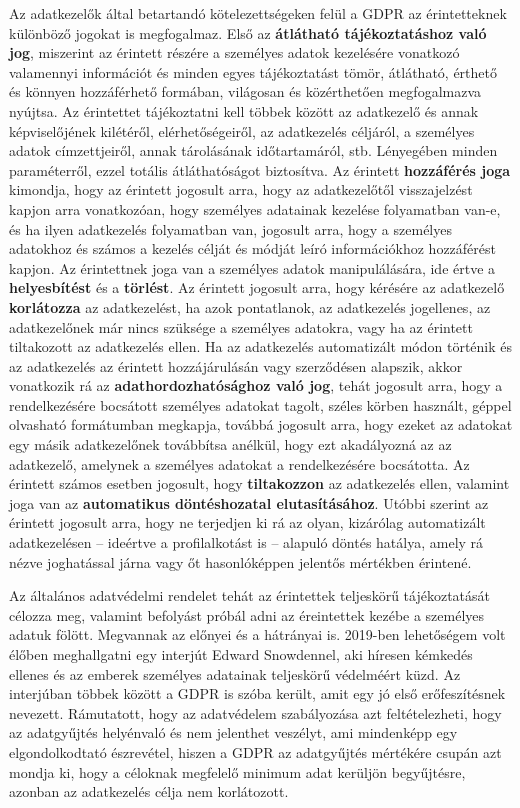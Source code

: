 Az adatkezelők által betartandó kötelezettségeken felül a GDPR az érintetteknek különböző jogokat is megfogalmaz. Első az \textbf{átlátható tájékoztatáshoz való jog}, miszerint az érintett részére a személyes adatok kezelésére vonatkozó valamennyi információt és minden egyes tájékoztatást tömör, átlátható, érthető és könnyen hozzáférhető formában, világosan és közérthetően megfogalmazva nyújtsa. Az érintettet tájékoztatni kell többek között az adatkezelő és annak képviselőjének kilétéről, elérhetőségeiről, az adatkezelés céljáról, a személyes adatok címzettjeiről, annak tárolásának időtartamáról, stb. Lényegében minden paraméterről, ezzel totális átláthatóságot biztosítva. Az érintett \textbf{hozzáférés joga} kimondja, hogy az érintett jogosult arra, hogy az adatkezelőtől visszajelzést kapjon arra vonatkozóan, hogy személyes adatainak kezelése folyamatban van-e, és ha ilyen adatkezelés folyamatban van, jogosult arra, hogy a személyes adatokhoz és számos a kezelés célját és módját leíró információkhoz hozzáférést kapjon. Az érintettnek joga van a személyes adatok manipulálására, ide értve a \textbf{helyesbítést} és a \textbf{törlést}. Az érintett jogosult arra, hogy kérésére az adatkezelő \textbf{korlátozza} az adatkezelést, ha azok pontatlanok, az adatkezelés jogellenes, az adatkezelőnek már nincs szüksége a személyes adatokra, vagy ha az érintett tiltakozott az adatkezelés ellen. Ha az adatkezelés automatizált módon történik és az adatkezelés az érintett hozzájárulásán vagy szerződésen alapszik, akkor vonatkozik rá az \textbf{adathordozhatósághoz való jog}, tehát jogosult arra, hogy a rendelkezésére bocsátott személyes adatokat tagolt, széles körben használt, géppel olvasható formátumban megkapja, továbbá jogosult arra, hogy ezeket az adatokat egy másik adatkezelőnek továbbítsa anélkül, hogy ezt akadályozná az az adatkezelő, amelynek a személyes adatokat a rendelkezésére bocsátotta. Az érintett számos esetben jogosult, hogy \textbf{tiltakozzon} az adatkezelés ellen, valamint joga van az \textbf{automatikus döntéshozatal elutasításához}. Utóbbi szerint az érintett jogosult arra, hogy ne terjedjen ki rá az olyan, kizárólag automatizált adatkezelésen – ideértve a profilalkotást is – alapuló döntés hatálya, amely rá nézve joghatással járna vagy őt hasonlóképpen jelentős mértékben érintené. \cite{GDPR}

Az általános adatvédelmi rendelet tehát az érintettek teljeskörű tájékoztatását célozza meg, valamint befolyást próbál adni az éreintettek kezébe a személyes adatuk fölött. Megvannak az előnyei és a hátrányai is. 2019-ben lehetőségem volt élőben meghallgatni egy interjút \cite{Snowden} Edward Snowdennel, aki híresen kémkedés ellenes és az emberek személyes adatainak teljeskörű védelméért küzd. Az interjúban többek között a GDPR is szóba került, amit egy jó első erőfeszítésnek nevezett. Rámutatott, hogy az adatvédelem szabályozása azt feltételezheti, hogy az adatgyűjtés helyénvaló és nem jelenthet veszélyt, ami mindenképp egy elgondolkodtató észrevétel, hiszen a GDPR az adatgyűjtés mértékére csupán azt mondja ki, hogy a céloknak megfelelő minimum adat kerüljön begyűjtésre, azonban az adatkezelés célja nem korlátozott.